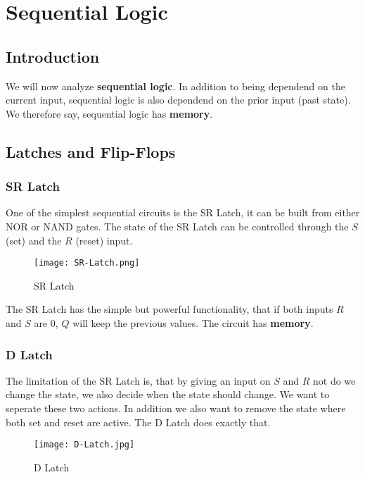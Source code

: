 \chapter{Sequential Logic}

\section{Introduction}

We will now analyze \textbf{sequential logic}. In addition to being dependend on the current input,
sequential logic is also dependend on the prior input (past state). We therefore say, sequential
logic has \textbf{memory}.

\section{Latches and Flip-Flops}
\subsection{SR Latch}

One of the simplest sequential circuits is the SR Latch, it can be built from either NOR
or NAND gates. The state of the SR Latch can be controlled through the $S$ (set) and the $R$ (reset) 
input.

\begin{figure}[h]
    \centering
    \texttt{[image: SR-Latch.png]}
    \caption{SR Latch}
\end{figure}

The SR Latch has the simple but powerful functionality, that if both inputs $R$ and $S$ are $0$, $Q$
will keep the previous values. The circuit has \textbf{memory}.

\subsection{D Latch}

The limitation of the SR Latch is, that by giving an input on $S$ and $R$ not do we change the state,
we also decide when the state should change. We want to seperate these two actions. In addition we
also want to remove the state where both set and reset are active. The D Latch does exactly that.
\pagebreak

\begin{figure}[h]
    \centering
    \texttt{[image: D-Latch.jpg]}
    \caption{D Latch}
\end{figure}

